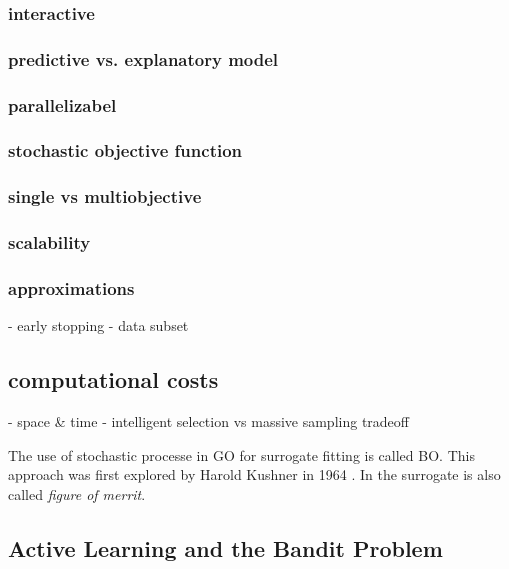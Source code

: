 \documentclass[english]{article}
\begin{document}
\subsubsection*{interactive}

\subsubsection*{predictive vs. explanatory model}

\subsubsection*{parallelizabel}

\subsubsection*{stochastic objective function}

\subsubsection*{single vs multiobjective}

\subsubsection*{scalability}

\subsubsection*{approximations}
 - early stopping
 - data subset

 \subsection{computational costs}
 - space \& time
 - intelligent selection vs massive sampling tradeoff


The use of stochastic processe in \ac{GO} for surrogate fitting is called \ac{BO}. This approach was first explored by Harold Kushner in 1964 \cite{kushner_new_1964}. In \cite{jones_efficient_1998} the surrogate is also called \textit{figure of merrit}.


\subsection{Active Learning and the Bandit Problem}
\end{document}

